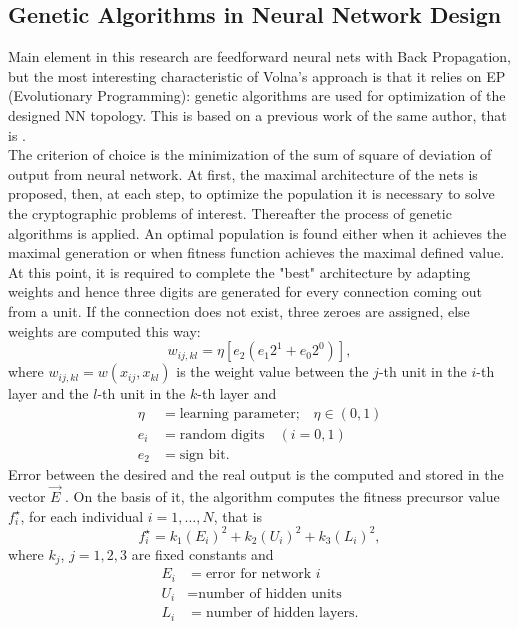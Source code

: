 \documentclass[%
    corpo=11pt,
    twoside,
    stile=classica,
    oldstyle,
    autoretitolo,
    tipotesi=magistrale,
    greek,
    evenboxes,
    english
]{toptesi}
\begin{document}
\subsection{Genetic Algorithms in Neural Network Design}
Main element in this research are feedforward neural nets with Back Propagation, but the most interesting characteristic of Volna's approach is that it relies on EP (Evolutionary Programming): genetic algorithms are used for optimization of the designed NN topology. This is based on a previous work of the same author, that is \cite{volna2}. \\
The criterion of choice is the minimization of the sum of square of deviation of output from neural network. At first, the maximal architecture of the nets is proposed, then, at each step, to optimize the population it is necessary to solve the cryptographic problems of interest. Thereafter the process of genetic algorithms is applied. An optimal population is found either when it achieves the maximal generation or when fitness function achieves the maximal defined value. \\
At this point, it is required to complete the "best" architecture by adapting weights and hence three digits are generated for every
connection coming out from a unit. If the connection does not exist, three zeroes are assigned, else weights are computed this way:
\begin{equation}
w_{ij,kl} = \eta[e_2(e_1 2^1 + e_0 2^0)],
\end{equation}
where $w_{ij,kl} = w(x_{ij}, x_{kl})$ is the weight value between the $j$-th unit in the $i$-th layer and the $l$-th unit in the $k$-th layer and
\begin{align*}
    \eta &= \text{learning parameter;} \quad \eta \in (0,1)\\
    e_i &= \text{random digits} \quad (i=0,1)\\
  	e_2 &= \text{sign bit}.
\end{align*}
Error between the desired and the real output is the computed and stored in the vector $\vec{E}$ . On the basis of it, the algorithm computes the fitness precursor value $f_i^{\star}$, for each individual $i = 1, \dots, N$, that is
\begin{equation}
f_i^{\star} = k_1(E_i)^2 + k_2(U_i)^2 + k_3(L_i)^2,
\end{equation}
where $k_j$, $j = 1,2,3$ are fixed constants and
\begin{align*}
    E_i &= \text{error for network }i\\
    U_i &= \text{number of hidden units}\\
  	L_i &= \text{number of hidden layers}.
\end{align*}
\end{document}

